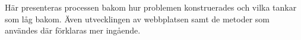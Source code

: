 \textcolor{lila}{Här presenteras processen bakom hur problemen konstruerades och vilka tankar som låg bakom. Även utvecklingen av webbplatsen samt de metoder som användes där förklaras mer ingående.}